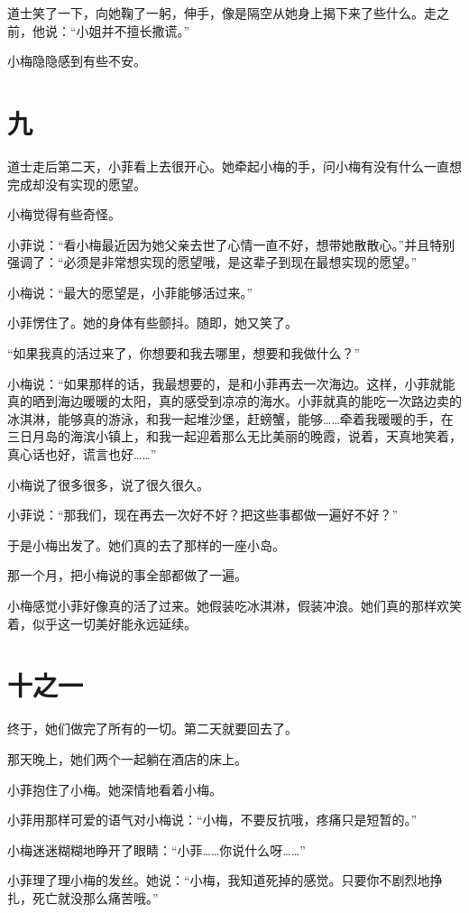 \documentclass[12pt,a4paper]{ctexart}
\begin{document}
道士笑了一下，向她鞠了一躬，伸手，像是隔空从她身上揭下来了些什么。走之前，他说：“小姐并不擅长撒谎。”

小梅隐隐感到有些不安。

\section*{九}

道士走后第二天，小菲看上去很开心。她牵起小梅的手，问小梅有没有什么一直想完成却没有实现的愿望。

小梅觉得有些奇怪。

小菲说：“看小梅最近因为她父亲去世了心情一直不好，想带她散散心。”并且特别强调了：“必须是非常想实现的愿望哦，是这辈子到现在最想实现的愿望。”

小梅说：“最大的愿望是，小菲能够活过来。”

小菲愣住了。她的身体有些颤抖。随即，她又笑了。

“如果我真的活过来了，你想要和我去哪里，想要和我做什么？”

小梅说：“如果那样的话，我最想要的，是和小菲再去一次海边。这样，小菲就能真的晒到海边暖暖的太阳，真的感受到凉凉的海水。小菲就真的能吃一次路边卖的冰淇淋，能够真的游泳，和我一起堆沙堡，赶螃蟹，能够……牵着我暖暖的手，在三日月岛的海滨小镇上，和我一起迎着那么无比美丽的晚霞，说着，天真地笑着，真心话也好，谎言也好……”

小梅说了很多很多，说了很久很久。

小菲说：“那我们，现在再去一次好不好？把这些事都做一遍好不好？”

于是小梅出发了。她们真的去了那样的一座小岛。

那一个月，把小梅说的事全部都做了一遍。

小梅感觉小菲好像真的活了过来。她假装吃冰淇淋，假装冲浪。她们真的那样欢笑着，似乎这一切美好能永远延续。

\section*{十之一}

终于，她们做完了所有的一切。第二天就要回去了。

那天晚上，她们两个一起躺在酒店的床上。

小菲抱住了小梅。她深情地看着小梅。

小菲用那样可爱的语气对小梅说：“小梅，不要反抗哦，疼痛只是短暂的。”

小梅迷迷糊糊地睁开了眼睛：“小菲……你说什么呀……”

小菲理了理小梅的发丝。她说：“小梅，我知道死掉的感觉。只要你不剧烈地挣扎，死亡就没那么痛苦哦。”
\end{document}
